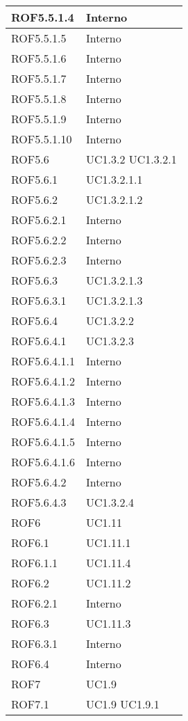 \begin{center}
\begin{longtable}{| p{4cm} | p{4cm} |}
\hline
ROF5.5.1.4   &  Interno \\
\hline
ROF5.5.1.5   &  Interno \\
\hline
ROF5.5.1.6   &  Interno \\
\hline
ROF5.5.1.7   &  Interno \\
\hline
ROF5.5.1.8   &  Interno \\
\hline
ROF5.5.1.9   &  Interno \\
\hline
ROF5.5.1.10   &  Interno \\
\hline
ROF5.6   &  UC1.3.2 \newline UC1.3.2.1 \\
\hline
ROF5.6.1   &  UC1.3.2.1.1 \\
\hline
ROF5.6.2   &  UC1.3.2.1.2 \\
\hline
ROF5.6.2.1   &  Interno \\
\hline
ROF5.6.2.2   &  Interno \\
\hline
ROF5.6.2.3   &  Interno \\
\hline
ROF5.6.3   &  UC1.3.2.1.3 \\
\hline
ROF5.6.3.1   &  UC1.3.2.1.3 \\
\hline
ROF5.6.4   &  UC1.3.2.2 \\
\hline
ROF5.6.4.1   &  UC1.3.2.3 \\
\hline
ROF5.6.4.1.1   &  Interno \\
\hline
ROF5.6.4.1.2   &  Interno \\
\hline
ROF5.6.4.1.3   &  Interno \\
\hline
ROF5.6.4.1.4   &  Interno \\
\hline
ROF5.6.4.1.5   &  Interno \\
\hline
ROF5.6.4.1.6   &  Interno \\
\hline
ROF5.6.4.2   &  Interno \\
\hline
ROF5.6.4.3   &  UC1.3.2.4 \\
\hline
ROF6   &  UC1.11 \\
\hline
ROF6.1   &  UC1.11.1 \\
\hline
ROF6.1.1   &  UC1.11.4 \\
\hline
ROF6.2   &  UC1.11.2 \\
\hline
ROF6.2.1   &  Interno \\
\hline
ROF6.3   &  UC1.11.3 \\
\hline
ROF6.3.1   &  Interno \\
\hline
ROF6.4   &  Interno \\
\hline
ROF7   &  UC1.9 \\
\hline
ROF7.1   &  UC1.9 \newline UC1.9.1 \\

\end{longtable}
\end{center}
